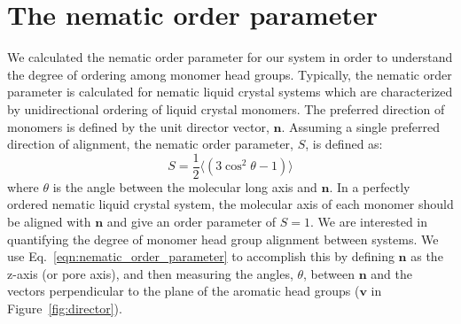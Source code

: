 \documentclass{article}
\begin{document}
%	

  \section{The nematic order parameter}\label{method:nematic_order}

  We calculated the nematic order parameter for our system in order to
  understand the degree of ordering among monomer head groups. Typically, the
  nematic order parameter is calculated for nematic liquid crystal systems which
  are characterized by unidirectional ordering of liquid crystal monomers. The
  preferred direction of monomers is defined by the unit director vector,
  $\mathbf{n}$. Assuming a single preferred direction of alignment, the nematic
  order parameter, $S$, is defined as:
  \begin{equation}
	 S = \frac{1}{2} \langle(3\cos^2\theta -1)\rangle
	\label{eqn:nematic_order_parameter}
  \end{equation}
  where $\theta$ is the angle between the molecular long axis and $\mathbf{n}$.
  In a perfectly ordered nematic liquid crystal system, the molecular axis of each
  monomer should be aligned with $\mathbf{n}$ and give an order parameter of $S=1$. 
  We are interested in quantifying the degree of monomer head group alignment 
  between systems. We use Eq.~\ref{eqn:nematic_order_parameter} to accomplish this
  by defining $\mathbf{n}$ as the z-axis (or pore axis), and then measuring the angles,
  $\theta$, between $\mathbf{n}$ and the vectors perpendicular to the plane of
  the aromatic head groups ($\mathbf{v}$ in Figure~\ref{fig:director}). 
  
\end{document}

